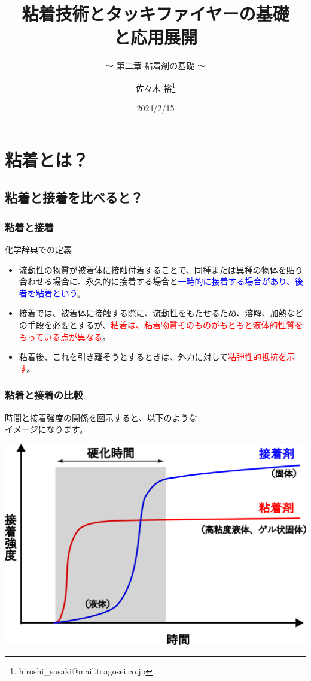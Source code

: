 \documentclass[unicode,12pt]{beamer}%
\title{粘着技術とタッキファイヤーの基礎\\と応用展開}
\subtitle{～ 第二章 粘着剤の基礎 ～}
\author[東亞合成 佐々木]{佐々木 裕\thanks{hiroshi\_sasaki@mail.toagosei.co.jp}}
\institute[東亞合成]{東亞合成株式会社}
\date{2024/2/15}
\begin{document}
\maketitle

\begin{frame} 
    \tableofcontents[]
\end{frame} 


\section{粘着とは？}
\subsection{粘着と接着を比べると？}
\begin{frame}
	\frametitle{粘着と接着}
		\begin{block}{化学辞典での定義}
			\begin{itemize}
				\item 流動性の物質が被着体に接触付着することで、同種または異種の物体を貼り合わせる場合に、永久的に接着する場合と\textcolor{blue}{一時的に接着する場合があり、後者を粘着という}。
				\item 接着では、被着体に接触する際に、流動性をもたせるため、溶解、加熱などの手段を必要とするが、\textcolor{red}{粘着は、粘着物質そのものがもともと液体的性質をもっている点が異なる}。
				\item 粘着後、これを引き離そうとするときは、外力に対して\textcolor{red}{粘弾性的抵抗を示す}。
			\end{itemize}
		\end{block}
\end{frame}

\begin{frame}
	\frametitle{粘着と接着の比較}
		時間と接着強度の関係を図示すると、以下のような\\イメージになります。

		\vspace{5mm}
			\centering
				\includegraphics[width=.8\textwidth]{../fig/adh_psa.png}
		
\end{frame}
\end{document}
